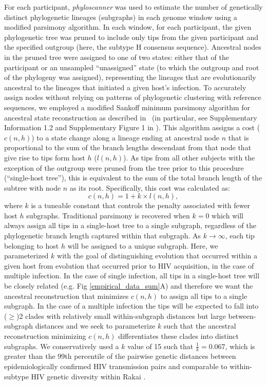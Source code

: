 \documentclass[10pt,letterpaper]{article}
\begin{document}
For each participant, \textit{phyloscanner} was used to estimate the number of genetically distinct phylogenetic lineages (subgraphs) in each genome window using a modified parsimony algorithm. In each window, for each participant, the given phylogenetic tree was pruned to include only tips from the given participant and the specified outgroup (here, the subtype H consensus sequence). Ancestral nodes in the pruned tree were assigned to one of two states: either that of the  participant or an unsampled ``unassigned'' state (to which the outgroup and root of the phylogeny was assigned), representing the lineages that are evolutionarily ancestral to the lineages that initiated a given host's infection. To accurately assign nodes without relying on patterns of phylogenetic clustering with reference sequences, we employed a modified Sankoff minimum parsimony algorithm for ancestral state reconstruction as described in~\cite{sankoff1975,wymant2017} (in particular, see Supplementary Information 1.2 and Supplementary Figure 1 in \cite{wymant2017}). This algorithm assigns a cost ($c(n,h)$) to a state change along a lineage ending at ancestral node $n$ that is proportional to the sum of the branch lengths descendant from that node that give rise to tips form host $h$ ($l(n,h)$). As tips from all other subjects with the exception of the outgroup were pruned from the tree prior to this procedure (``single-host tree''), this is equivalent to the sum of the total branch length of the subtree with node $n$ as its root. Specifically, this cost was calculated as: 
\begin{equation}
c(n,h) = 1 + k \times l(n,h),
\end{equation}
where $k$ is a tuneable constant that controls the penalty associated with fewer host $h$ subgraphs. Traditional parsimony is recovered when $k=0$ which will always assign all tips in a single-host tree to a single subgraph, regardless of the phylogenetic branch length captured within that subgraph. As $k \to \infty$, each tip belonging to host $h$ will be assigned to a unique subgraph. Here, we parameterized $k$ with the goal of distinguishing evolution that occurred within a given host from evolution that occurred prior to HIV acquisition, in the case of multiple infection. In the case of single infection, all tips in a single-host tree will be closely related (e.g. Fig \ref{empirical_data_sum}A) and therefore we want the ancestral reconstruction that minimizes $c(n,h)$ to assign all tips to a single subgraph. In the case of a multiple infection the tips will be expected to fall into ($\ge$)2 clades with relatively small within-subgraph distances but large between-subgraph distances and we seek to parameterize $k$ such that the ancestral reconstruction minimizing $c(n,h)$ differentiates these clades into distinct subgraphs. We conservatively used a $k$ value of 15 such that $\frac{1}{k} = 0.067$, which is greater than the 99th percentile of the pairwise genetic distances between epidemiologically confirmed HIV transmission pairs \cite{ratmann2019} and comparable to within-subtype HIV genetic diversity within Rakai \cite{kim2024}.  \par
\end{document}
